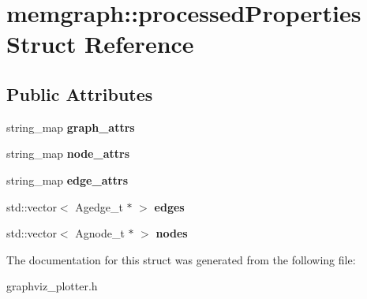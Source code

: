 \hypertarget{structmemgraph_1_1processed_properties}{}\section{memgraph\+:\+:processed\+Properties Struct Reference}
\label{structmemgraph_1_1processed_properties}
\subsection*{Public Attributes}
\begin{DoxyCompactItemize}
\item 
string\+\_\+map {\bfseries graph\+\_\+attrs}\hypertarget{structmemgraph_1_1processed_properties_a0a0613980a6ab7a9fda1ce686a1cde30}{}\label{structmemgraph_1_1processed_properties_a0a0613980a6ab7a9fda1ce686a1cde30}

\item 
string\+\_\+map {\bfseries node\+\_\+attrs}\hypertarget{structmemgraph_1_1processed_properties_a653311d635867c87f1155bace0286d1e}{}\label{structmemgraph_1_1processed_properties_a653311d635867c87f1155bace0286d1e}

\item 
string\+\_\+map {\bfseries edge\+\_\+attrs}\hypertarget{structmemgraph_1_1processed_properties_a611f79f833a30b256fa234b759e38a4b}{}\label{structmemgraph_1_1processed_properties_a611f79f833a30b256fa234b759e38a4b}

\item 
std\+::vector$<$ Agedge\+\_\+t $\ast$ $>$ {\bfseries edges}\hypertarget{structmemgraph_1_1processed_properties_a559550b639268479dfe03559f394e57e}{}\label{structmemgraph_1_1processed_properties_a559550b639268479dfe03559f394e57e}

\item 
std\+::vector$<$ Agnode\+\_\+t $\ast$ $>$ {\bfseries nodes}\hypertarget{structmemgraph_1_1processed_properties_a3499243bf738803d4a1a6f867a97d93b}{}\label{structmemgraph_1_1processed_properties_a3499243bf738803d4a1a6f867a97d93b}

\end{DoxyCompactItemize}


The documentation for this struct was generated from the following file\+:\begin{DoxyCompactItemize}
\item 
graphviz\+\_\+plotter.\+h\end{DoxyCompactItemize}
